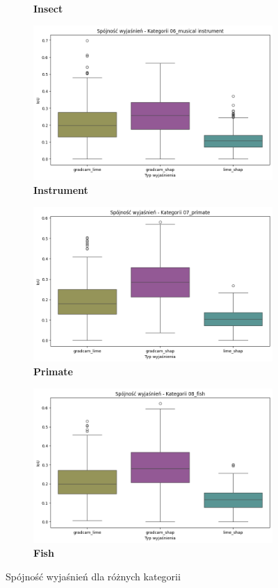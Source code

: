 \begin{figure}[h]
\begin{subfigure}[b]{0.3\textwidth}
		\caption{\textbf{Insect}}  \label{}
	\end{subfigure}
	\begin{subfigure}[b]{0.3\textwidth}
		\centering\includegraphics[width=.9\textwidth]{img/base_coherence_music}
		\caption{\textbf{Instrument}}  \label{}
	\end{subfigure}
	\begin{subfigure}[b]{0.3\textwidth}
		\centering\includegraphics[width=.9\textwidth]{img/base_coherence_primate}
		\caption{\textbf{Primate}}  \label{}
	\end{subfigure}
	\begin{subfigure}[b]{0.3\textwidth}
		\centering\includegraphics[width=.9\textwidth]{img/base_coherence_fish}
		\caption{\textbf{Fish}}  \label{}
	\end{subfigure}
	\caption{Spójność wyjaśnień dla różnych kategorii}
	\label{rys:coherence_category}
\end{figure}

